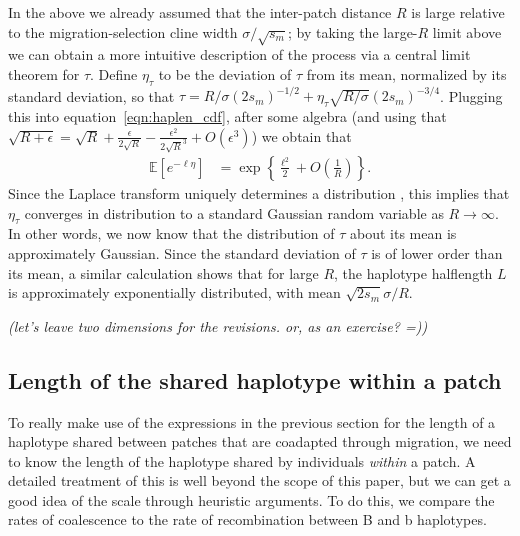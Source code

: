 \documentclass{article}
\newcommand{\E}{\mathbb{E}}
\newcommand{\plr}[1]{{\it\color{blue}(#1)}}
\begin{document}
In the above we already assumed that the inter-patch distance $R$ is large relative to the migration-selection cline width $\sigma/\sqrt{s_m}$;
by taking the large-$R$ limit above we can obtain a more intuitive description of the process
via a central limit theorem for $\tau$.
Define $\eta_\tau$ to be the deviation of $\tau$ from its mean, normalized by its standard deviation,
so that $\tau = R/\sigma(2s_m)^{-1/2} + \eta_\tau \sqrt{R/\sigma} (2s_m)^{-3/4}$.
Plugging this into equation~\eqref{eqn:haplen_cdf},
after some algebra (and using that $\sqrt{R+\epsilon} = \sqrt{R} + \frac{\epsilon}{2\sqrt{R}} - \frac{\epsilon^2}{2\sqrt{R}^3} + O(\epsilon^3)$) we obtain that
\begin{align}
  \E[e^{-\ell \eta}] &= \exp\left\{ \frac{\ell^2}{2} + O\left(\frac{1}{R}\right) \right\}.
\end{align}
Since the Laplace transform uniquely determines a distribution \citep{durrett1996probability},
this implies that $\eta_\tau$ converges in distribution to a standard Gaussian random variable as $R \to \infty$.
In other words, we now know that the distribution of $\tau$ about its mean is approximately Gaussian.
Since the standard deviation of $\tau$ is of lower order than its mean,
a similar calculation shows that for large $R$, the haplotype halflength $L$ is approximately exponentially distributed, 
with mean $\sqrt{2s_m} \sigma/R$.


\plr{let's leave two dimensions for the revisions. or, as an exercise? =)}


\subsection{Length of the shared haplotype within a patch}

To really make use of the expressions in the previous section for the length of a haplotype shared
between patches that are coadapted through migration,
we need to know the length of the haplotype shared by individuals \emph{within} a patch.
A detailed treatment of this is well beyond the scope of this paper,
but we can get a good idea of the scale through heuristic arguments.
To do this, we compare the rates of coalescence to the rate of recombination between B and b haplotypes.
\end{document}
